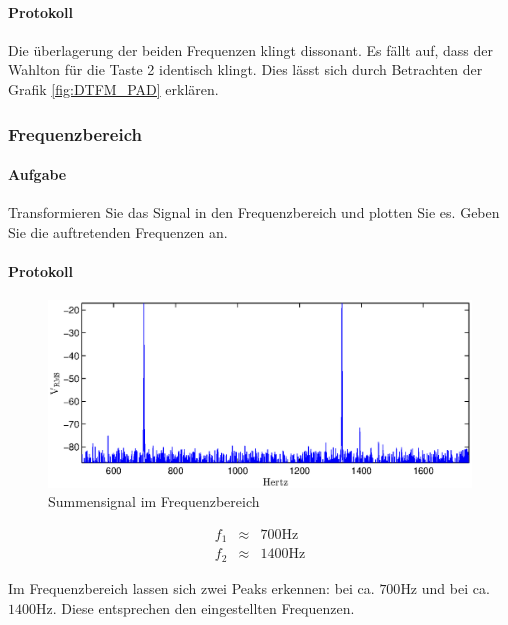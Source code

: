 \documentclass[10pt]{scrreprt}
\begin{document}
        \paragraph{Protokoll}
        Die überlagerung der beiden Frequenzen klingt dissonant. Es fällt auf, dass
        der Wahlton für die Taste 2 identisch klingt. Dies lässt sich durch
        Betrachten der Grafik \ref{fig:DTFM_PAD} erklären.


        \subsubsection{Frequenzbereich}
        \paragraph{Aufgabe}
        Transformieren Sie das Signal in den Frequenzbereich und plotten Sie es. Geben Sie
        die auftretenden Frequenzen an.
        \paragraph{Protokoll}
        \begin{center}
            \begin{figure}[H]
                \includegraphics[width=\textwidth]{Screenshot_GUI_4204_beser}
              \caption{Summensignal im Frequenzbereich}
            \end{figure}
        \end{center}
        \begin{eqnarray*}
            f_1 &\approx& 700\si{\hertz}\\
            f_2 &\approx& 1400\si{\hertz}
        \end{eqnarray*}

        Im Frequenzbereich lassen sich zwei Peaks erkennen: bei ca. $700\si{\hertz}$
        und bei ca. $1400\si{\hertz}$. Diese entsprechen den eingestellten
        Frequenzen.
\end{document}
